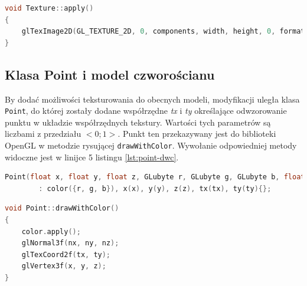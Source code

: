 \begin{lstlisting}[language=C++, caption=Metoda \lstinline{apply} klasy \lstinline{Texture}., label={lst:texture-apply}]
void Texture::apply()
{
    glTexImage2D(GL_TEXTURE_2D, 0, components, width, height, 0, format, GL_UNSIGNED_BYTE, pBytes);
}
\end{lstlisting}

\subsection{Klasa Point i model czworościanu}
By dodać możliwości teksturowania do obecnych modeli, modyfikacji uległa klasa \lstinline{Point}, do której zostały dodane współrzędne \textit{tx} i \textit{ty} określające odwzorowanie punktu w układzie współrzędnych tekstury. Wartości tych parametrów są liczbami z przedziału $<0;1>$. Punkt ten przekazywany jest do biblioteki OpenGL w metodzie rysującej \lstinline{drawWithColor}. Wywołanie odpowiedniej metody widoczne jest w linijce 5 listingu \ref{lst:point-dwc}.
\begin{lstlisting}[language=C++, caption=Konstruktor klasy \lstinline{Point}., label={lst:point-construct}]
Point(float x, float y, float z, GLubyte r, GLubyte g, GLubyte b, float tx = 0, float ty = 0)
        : color({r, g, b}), x(x), y(y), z(z), tx(tx), ty(ty){};

\end{lstlisting}
\begin{lstlisting}[language=C++, caption=Metoda \lstinline{drawWithColor} klasy \lstinline{Point}., label={lst:point-dwc}]
void Point::drawWithColor()
{
    color.apply();
    glNormal3f(nx, ny, nz);
    glTexCoord2f(tx, ty);
    glVertex3f(x, y, z);
}
\end{lstlisting}

